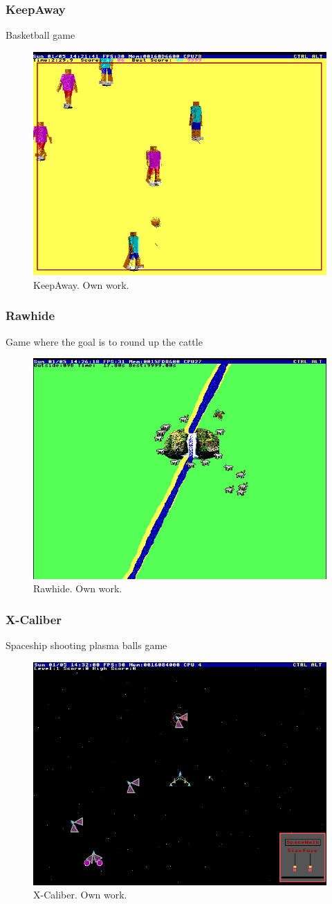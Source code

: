 \documentclass{beamer}
\begin{document}
	\begin{frame}
		\frametitle{KeepAway}
		Basketball game
		\begin{figure}
			\centering
			\includegraphics[width=0.6\linewidth]{images/keep_away.png}
			\caption{KeepAway. Own work.}
			\label{fig:keep_away}
		\end{figure}
	\end{frame}

	\begin{frame}
		\frametitle{Rawhide}
		Game where the goal is to round up the cattle
		\begin{figure}
			\centering
			\includegraphics[width=0.6\linewidth]{images/rawhide.png}
			\caption{Rawhide. Own work.}
			\label{fig:rawhide}
		\end{figure}
	\end{frame}

	\begin{frame}
		\frametitle{X-Caliber}
		Spaceship shooting plasma balls game
		\begin{figure}
			\centering
			\includegraphics[width=0.6\linewidth]{images/xcaliber.png}
			\caption{X-Caliber. Own work.}
			\label{fig:xcaliber}
		\end{figure}
	\end{frame}
\end{document}
